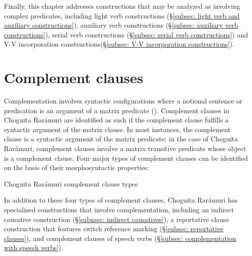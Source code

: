 Finally, this chapter addresses constructions that may be analyzed as involving complex predicates, including light verb constructions (§\ref{subsec: light verb and auxiliary constructions}), auxiliary verb constructions (§\ref{subsec: auxiliary verb constructions}), serial verb constructions (§\ref{subsec: serial verb constructions}) and V-V incorporation constructions(§\ref{subsec: V-V incorporation constructions}).


\section{Complement clauses}
\label{sec: complement clauses}


Complementation involves syntactic configurations where a notional sentence or predication is an argument of a matrix predicate (\citealt{noonan2007complementation}). Complement clauses in Choguita Rarámuri are identified as such if the complement clause fulfills a syntactic argument of the matrix clause. In most instances, the complement clause is a syntactic argument of the matrix predicate; in the case of Choguita Rarámuri, complement clauses involve a matrix transitive predicate whose object is a complement clause. Four major types of complement clauses can be identified on the basis of their morphosyntactic properties:

\ea\label{ex: types of complement clauses}
{Choguita Rarámuri complement clause types}

    \z
\z

In addition to these four types of complement clauses, Choguita Rarámuri has specialized constructions that involve complementation, including an indirect causative construction (§\ref{subxsec: indirect causatives}), a reportative clause construction that features switch reference marking (§\ref{subsec: reportative clauses}), and complement clauses of speech verbs (§\ref{subsec: complementation with speech verbs}).

